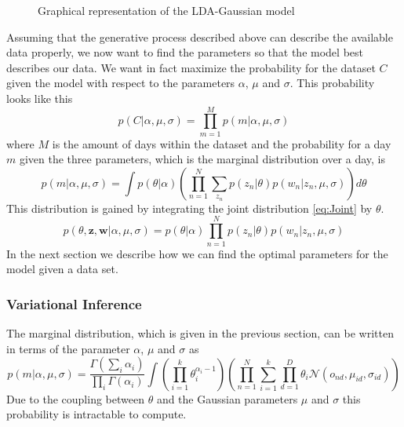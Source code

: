 \documentclass[11pt,a4paper]{article}
\begin{document}
\begin{figure}[h!]
\centering
\def\svgwidth{0.8\textwidth}

\caption{Graphical representation of the LDA-Gaussian model}
\label{fig:modelExt}
\end{figure}




  
Assuming that the generative process described above can describe the available data properly, we now want to find the parameters so that the model best describes our data. We want in fact maximize the probability for the dataset $C$ given the model with respect to the parameters $\alpha$, $\mu$ and $\sigma$. This probability looks like this
\begin{equation}
p(C|\alpha,\mu,\sigma) = \prod_{m=1}^M p(m|\alpha,\mu,\sigma)
\end{equation}
where $M$ is the amount of days within the dataset and the probability for a day $m$ given the three parameters, which is the marginal distribution over a day, is
\begin{equation} 
p(m|\alpha,\mu,\sigma) = \int p(\theta|\alpha)  \left( \prod_{n=1}^N \sum_{z_n} p(z_n|\theta) p(w_n|z_n, \mu,\sigma)  \right) d\theta
\end{equation}
This distribution is gained by integrating the joint distribution \ref{eq:Joint} by $\theta$.
\begin{equation} \label{eq:Joint}
 p(\theta,\textbf{z},\textbf{w}|\alpha,\mu,\sigma) = p(\theta|\alpha) \prod_{n=1}^N p(z_n|\theta) p(w_n|z_n,\mu,\sigma)
\end{equation}
In the next section we describe how we can find the optimal parameters for the model given a data set.


  
\subsubsection{Variational Inference}
 
The marginal distribution, which is given in the previous section, can be written in terms of the parameter $\alpha$, $\mu$ and $\sigma$ as
  \begin{equation}
   p(m|\alpha,\mu,\sigma) = \frac{\Gamma (\sum_i \alpha_i)}{\prod_i \Gamma(\alpha_i)} \int \left( \prod_{i=1}^k \theta_i^{\alpha_i-1} \right)
   \left( \prod_{n=1}^N \sum_{i=1}^k \prod_{d=1}^D \theta_i \mathcal{N}(o_{nd},\mu_{id},\sigma_{id} ) \right)
  \end{equation}
Due to the coupling between $\theta$ and the Gaussian parameters $\mu$ and $\sigma$ this probability is intractable to compute.	
\end{document}

